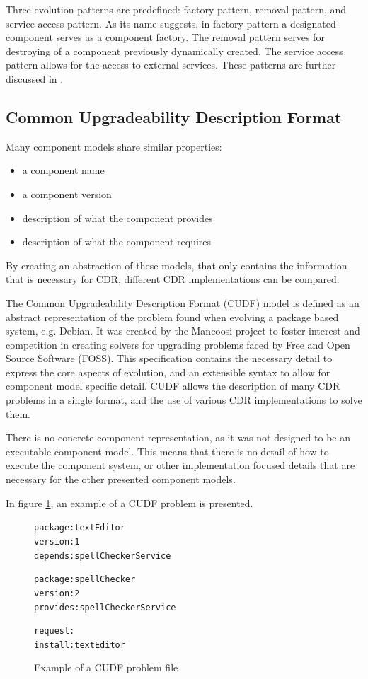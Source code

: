 Three evolution patterns are predefined: factory pattern, removal pattern, and service access pattern.
As its name suggests, in factory pattern a designated component serves as a component factory. 
The removal pattern serves for destroying of a component previously dynamically created.
The service access pattern allows for the access to external services.
These patterns are further discussed in \citep{Hnetynka2006}.


\subsection{Common Upgradeability Description Format}
Many component models share similar properties:
\begin{itemize}
  \item a component name
  \item a component version
  \item description of what the component provides
  \item description of what the component requires
\end{itemize} 

By creating an abstraction of these models, that only contains the information that is necessary for CDR, different CDR implementations can be compared.

The Common Upgradeability Description Format (CUDF) model is defined as an abstract representation of the problem found when evolving a package based system, e.g. Debian.
It was created by the Mancoosi project to foster interest and competition in creating solvers for upgrading problems faced by Free and Open Source Software (FOSS).
This specification contains the necessary detail to express the core aspects of evolution, and an extensible syntax to allow for component model specific detail. 
CUDF allows the description of many CDR problems in a single format, and the use of various CDR implementations to solve them. 

There is no concrete component representation, as it was not designed to be an executable component model.
This means that there is no detail of how to execute the component system, or other implementation focused details that are necessary for the other presented component models.

In figure \ref{CUDFmetadata}, an example of a CUDF problem is presented.

\begin{figure}[htp] 
\begin{center}
\begin{alltt}
package: textEditor
version: 1
depends: spellCheckerService

package: spellChecker
version: 2
provides: spellCheckerService

request:
install:textEditor

\end{alltt}
  \caption[CUDF meta-data file]{Example of a CUDF problem file}
  \label{CUDFmetadata}
\end{center}
\end{figure}

